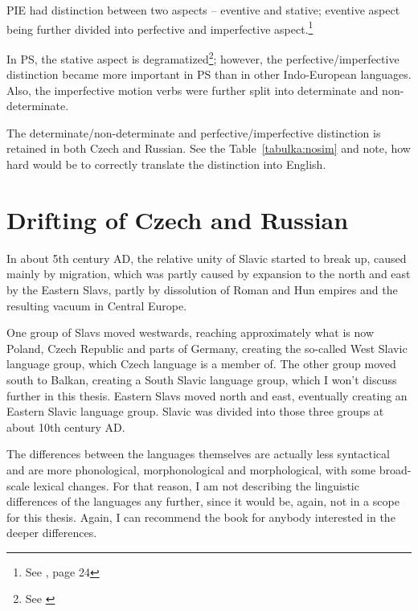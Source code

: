 PIE had distinction between two aspects -- eventive and stative; eventive aspect being further divided into perfective and imperfective aspect.\footnote{See \cite{ringe2008proto}, page 24}

In PS, the stative aspect is degramatized\footnote{See \cite{andersen2013origin}}; however, the perfective/imperfective distinction became more important in PS than in other Indo-European languages. Also, the imperfective motion verbs were further split into determinate and non-determinate.

The determinate/non-determinate and perfective/imperfective distinction is retained in both Czech and Russian. See the Table~\ref{tabulka:nosim} and note, how hard would be to correctly translate the distinction into English.


\section{Drifting of Czech and Russian}
In about 5th century AD, the relative unity of Slavic started to break up, caused mainly by migration, which was partly caused by expansion to the north and east by the Eastern Slavs, partly by dissolution of Roman and Hun empires and the resulting vacuum in Central Europe.

One group of Slavs moved westwards, reaching approximately what is now Poland, Czech Republic and parts of Germany, creating the so-called West Slavic language group, which Czech language is a member of. The other group moved south to Balkan, creating a South Slavic language group, which I won't discuss further in this thesis. Eastern Slavs moved north and east, eventually creating an Eastern Slavic language group. Slavic was divided into those three groups at about 10th century AD.

The differences between the languages themselves are actually less syntactical and are more phonological, morphonological and morphological, with some broad-scale lexical changes. For that reason, I am not describing the linguistic differences of the languages any further, since it would be, again, not in a scope for this thesis. Again, I can recommend the book \cite{sussex2011slavic} for anybody interested in the deeper differences.


